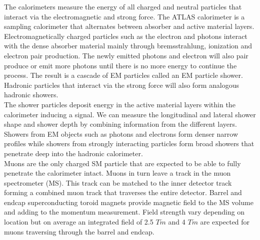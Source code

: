 \indent The calorimeters measure the energy of all charged and neutral particles that interact via the electromagnetic and strong force.   The ATLAS calorimeter is a sampling calorimeter that alternates between absorber and active material layers.   Electromagnetically charged particles such as the electron and photons interact with the dense absorber material mainly through bremsstrahlung, ionization and electron pair production.  The newly emitted photons and electron will also pair produce or emit more photons until there is no more energy to continue the process.  The result is a cascade of EM particles called an EM particle shower.  Hadronic particles that interact via the strong force will also form analogous hadronic showers.  \\



\indent The shower particles deposit energy in the active material layers within the calorimeter inducing a signal.  We can measure the longitudinal and lateral shower shape and shower depth by combining information from the different layers. Showers from EM objects such as photons and electrons form denser narrow profiles while showers from strongly interacting particles form broad showers that penetrate deep into the hadronic calorimeter. \\

\indent Muons are the only charged SM particle that are expected to be able to fully penetrate the calorimeter intact.  Muons in turn leave a track in the muon spectrometer (MS).  This track can be matched to the inner detector track forming a combined muon track that traverses the entire detector.  Barrel and endcap superconducting toroid magnets provide magnetic field to the MS volume and adding to the momentum measurement.  Field strength vary depending on location but on average an integrated field of 2.5 $T \dot m$ and 4 $T \dot m$ are expected for muons traversing through the barrel and endcap.\\

